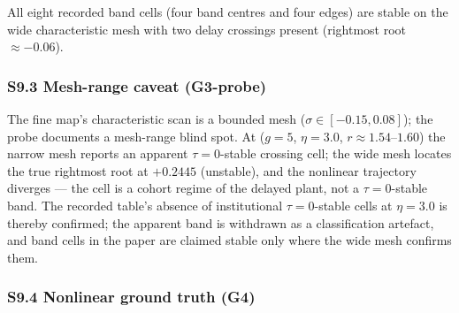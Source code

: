 \documentclass[
  10pt,
  a4paper,
]{article}
\begin{document}
All eight recorded band cells (four band centres and four edges) are
stable on the wide characteristic mesh with two delay crossings present
(rightmost root \(\approx -0.06\)).

\subsubsection{S9.3 Mesh-range caveat
(G3-probe)}\label{s9.3-mesh-range-caveat-g3-probe}

The fine map's characteristic scan is a bounded mesh
(\(\sigma \in [-0.15, 0.08]\)); the probe documents a mesh-range blind
spot. At (\(g = 5\), \(\eta = 3.0\), \(r \approx 1.54\)--\(1.60\)) the
narrow mesh reports an apparent \(\tau = 0\)-stable crossing cell; the
wide mesh locates the true rightmost root at \(+0.2445\) (unstable), and
the nonlinear trajectory diverges --- the cell is a cohort regime of the
delayed plant, not a \(\tau = 0\)-stable band. The recorded table's
absence of institutional \(\tau = 0\)-stable cells at \(\eta = 3.0\) is
thereby confirmed; the apparent band is withdrawn as a classification
artefact, and band cells in the paper are claimed stable only where the
wide mesh confirms them.

\subsubsection{S9.4 Nonlinear ground truth
(G4)}\label{s9.4-nonlinear-ground-truth-g4}
\end{document}
